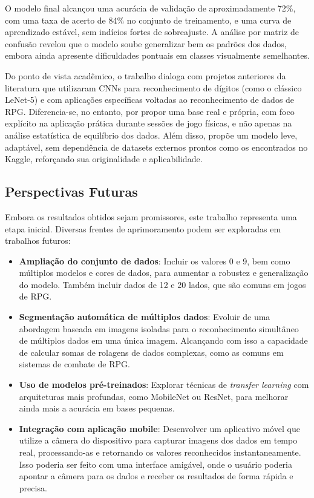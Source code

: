 O modelo final alcançou uma acurácia de validação de aproximadamente 72\%, com uma taxa de acerto de 84\% no conjunto de treinamento, 
e uma curva de aprendizado estável, sem indícios fortes de sobreajuste. A análise por matriz de confusão revelou que o modelo soube 
generalizar bem os padrões dos dados, embora ainda apresente dificuldades pontuais em classes visualmente semelhantes.

Do ponto de vista acadêmico, o trabalho dialoga com projetos anteriores da literatura que utilizaram CNNs para reconhecimento de dígitos 
(como o clássico LeNet-5) e com aplicações específicas voltadas ao reconhecimento de dados de RPG. Diferencia-se, no entanto, por propor 
uma base real e própria, com foco explícito na aplicação prática durante sessões de jogo físicas, e não apenas na análise estatística de 
equilíbrio dos dados. Além disso, propõe um modelo leve, adaptável, sem dependência de datasets externos prontos como os encontrados no 
Kaggle, reforçando sua originalidade e aplicabilidade.

\subsection*{Perspectivas Futuras}

Embora os resultados obtidos sejam promissores, este trabalho representa uma etapa inicial. Diversas frentes de aprimoramento podem ser 
exploradas em trabalhos futuros:

\begin{itemize}
    \item \textbf{Ampliação do conjunto de dados}: Incluir os valores 0 e 9, bem como múltiplos modelos e cores de dados, para aumentar a 
    robustez e generalização do modelo. Também incluir dados de 12 e 20 lados, que são comuns em jogos de RPG.
    \item \textbf{Segmentação automática de múltiplos dados}: Evoluir de uma abordagem baseada em imagens isoladas para o reconhecimento 
    simultâneo de múltiplos dados em uma única imagem. Alcançando com isso a capacidade de calcular somas de rolagens de dados
    complexas, como as comuns em sistemas de combate de RPG.
    \item \textbf{Uso de modelos pré-treinados}: Explorar técnicas de \textit{transfer learning} com arquiteturas mais profundas, 
    como MobileNet ou ResNet, para melhorar ainda mais a acurácia em bases pequenas.
    \item \textbf{Integração com aplicação mobile}: Desenvolver um aplicativo móvel que utilize a câmera do dispositivo para capturar
    imagens dos dados em tempo real, processando-as e retornando os valores reconhecidos instantaneamente. Isso poderia ser feito com
    uma interface amigável, onde o usuário poderia apontar a câmera para os dados e receber os resultados de forma rápida e precisa.
\end{itemize}

